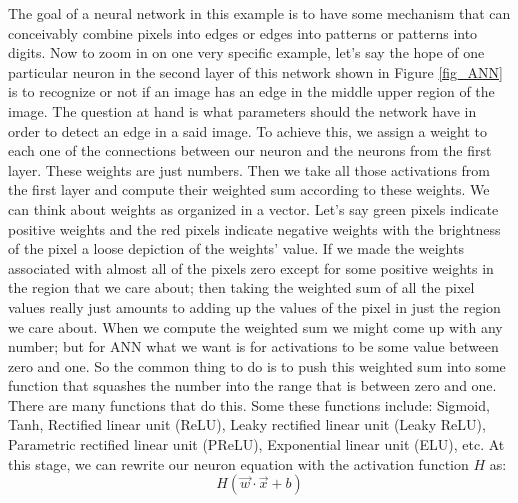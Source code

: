 \documentclass[master]{thesis-uestc}
\begin{document}
The goal of a neural network in this example is to have some mechanism that can conceivably combine pixels into edges or edges into patterns or patterns into digits. Now to zoom in on one very specific example, let's say the hope of one particular neuron in the second layer of this network shown in Figure \ref{fig_ANN} is to recognize or not if an image has an edge in the middle upper region of the image. The question at hand is what parameters should the network have in order to detect an edge in a said image. To achieve this, we assign a weight to each one of the connections between our neuron and the neurons from the first layer. These weights are just numbers. Then we take all those activations from the first layer and compute their weighted sum according to these weights. We can think about weights as organized in a vector. Let's say green pixels indicate positive weights and the red pixels indicate negative weights with the brightness of the pixel a loose depiction of the weights’ value. If we made the weights associated with almost all of the pixels zero except for some positive weights in the region that we care about; then taking the weighted sum of all the pixel values really just amounts to adding up the values of the pixel in just the region we care about. When we compute the weighted sum we might come up with any number; but for ANN what we want is for activations to be some value between zero and one. So the common thing to do is to push this weighted sum into some function that squashes the number into the range that is between zero and one. There are many functions that do this. Some these functions include: Sigmoid, Tanh, Rectified linear unit (ReLU), Leaky rectified linear unit (Leaky ReLU), Parametric rectified linear unit (PReLU), Exponential linear unit (ELU), etc. At this stage, we can rewrite our neuron equation with the activation function $H$ as:
\begin{equation}
    H(\vec{w} \cdot \vec{x} + b)
\end{equation}
\end{document}
